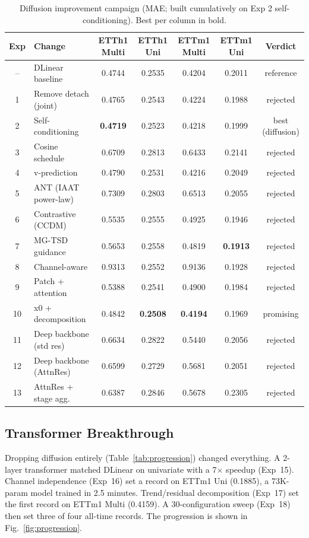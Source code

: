 \documentclass[conference]{IEEEtran}
\begin{document}
\begin{table}[t]
\caption{Diffusion improvement campaign (MAE; built cumulatively on Exp 2 self-conditioning). Best per column in bold.}
\label{tab:diffusion}
\centering
\small
\begin{tabular}{clccccc}
\toprule
Exp & Change & ETTh1 Multi & ETTh1 Uni & ETTm1 Multi & ETTm1 Uni & Verdict \\
\midrule
-- & DLinear baseline      & 0.4744 & 0.2535 & 0.4204 & 0.2011 & reference \\
1  & Remove detach (joint) & 0.4765 & 0.2543 & 0.4224 & 0.1988 & rejected \\
2  & Self-conditioning     & \textbf{0.4719} & 0.2523 & 0.4218 & 0.1999 & best (diffusion) \\
3  & Cosine schedule       & 0.6709 & 0.2813 & 0.6433 & 0.2141 & rejected \\
4  & v-prediction          & 0.4790 & 0.2531 & 0.4216 & 0.2049 & rejected \\
5  & ANT (IAAT power-law)   & 0.7309 & 0.2803 & 0.6513 & 0.2055 & rejected \\
6  & Contrastive (CCDM)     & 0.5535 & 0.2555 & 0.4925 & 0.1946 & rejected \\
7  & MG-TSD guidance        & 0.5653 & 0.2558 & 0.4819 & \textbf{0.1913} & rejected \\
8  & Channel-aware          & 0.9313 & 0.2552 & 0.9136 & 0.1928 & rejected \\
9  & Patch + attention      & 0.5388 & 0.2541 & 0.4900 & 0.1984 & rejected \\
10 & x0 + decomposition     & 0.4842 & \textbf{0.2508} & \textbf{0.4194} & 0.1969 & promising \\
11 & Deep backbone (std res)& 0.6634 & 0.2822 & 0.5440 & 0.2056 & rejected \\
12 & Deep backbone (AttnRes)& 0.6599 & 0.2729 & 0.5681 & 0.2051 & rejected \\
13 & AttnRes + stage agg.   & 0.6387 & 0.2846 & 0.5678 & 0.2305 & rejected \\
\bottomrule
\end{tabular}
\end{table}

\subsection{Transformer Breakthrough}
Dropping diffusion entirely (Table~\ref{tab:progression}) changed everything. A 2-layer transformer matched DLinear on univariate with a 7$\times$ speedup (Exp~15). Channel independence (Exp~16) set a record on ETTm1 Uni (0.1885), a 73K-param model trained in 2.5 minutes. Trend/residual decomposition (Exp~17) set the first record on ETTm1 Multi (0.4159). A 30-configuration sweep (Exp~18) then set three of four all-time records. The progression is shown in Fig.~\ref{fig:progression}.
\end{document}
